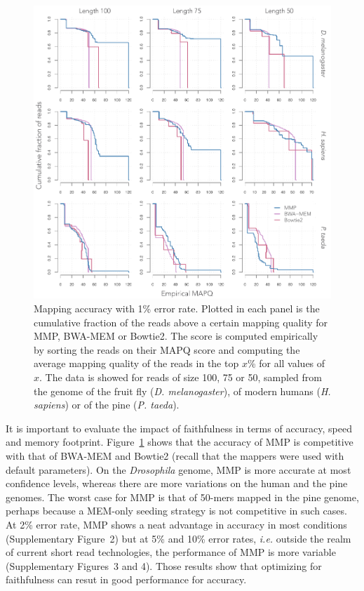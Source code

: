 \documentclass[english]{article}
\begin{document}
\begin{figure}[h]
\begin{center}
\includegraphics[scale=.6]{fig_acc.pdf}
\end{center}
\caption{Mapping accuracy with 1\% error rate. Plotted in each panel is
the cumulative fraction of the reads above a certain mapping quality for
MMP, BWA-MEM or Bowtie2. The score is computed empirically by sorting the
reads on their MAPQ score and computing the average mapping quality of the
reads in the top $x$\% for all values of $x$. The data is showed for reads
of size 100, 75 or 50, sampled from the genome of the fruit fly
(\textit{D. melanogaster}), of modern humans (\textit{H. sapiens}) or of
the pine (\textit{P. taeda}).}
\label{fig_acc}
\end{figure}

It is important to evaluate the impact of faithfulness in terms of
accuracy, speed and memory footprint. Figure~\ref{fig_acc} shows that the
accuracy of MMP is competitive with that of BWA-MEM and Bowtie2 (recall
that the mappers were used with default parameters). On the
\textit{Drosophila} genome, MMP is more accurate at most confidence
levels, whereas there are more variations on the human and the pine
genomes. The worst case for MMP is that of 50-mers mapped in the pine
genome, perhaps because a MEM-only seeding strategy is not competitive in
such cases. At 2\% error rate, MMP shows a neat advantage in accuracy in
most conditions (Supplementary Figure~2) but at 5\% and 10\% error rates,
\textit{i.e.} outside the realm of current short read technologies, the
performance of MMP is more variable (Supplementary Figures~3 and 4). Those
results show that optimizing for faithfulness can resut in good
performance for accuracy.
\end{document}
